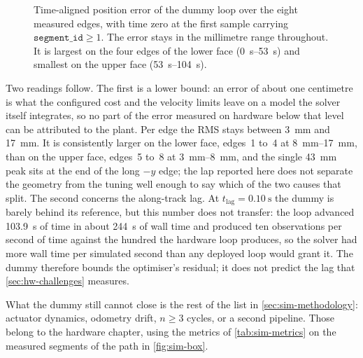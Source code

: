 \begin{figure}[htbp]
  \centering
  \caption[Residual of the dummy loop over the measured path]{%
    Time-aligned \ee{} position error of the dummy loop over the eight
    measured edges, with time zero at the first sample carrying
    $\texttt{segment\_id}\ge 1$. The error stays in the millimetre range
    throughout. It is largest on the four edges of the lower face
    (\qtyrange{0}{53}{\second}) and smallest on the upper face
    (\qtyrange{53}{104}{\second}).}
  \label{fig:sim-dummy-error}
\end{figure}

Two readings follow. The first is a lower bound: an \ee{} error of
about one centimetre is what the configured cost and the velocity limits
leave on a model the solver itself integrates, so no part of the error
measured on hardware below that level can be attributed to the plant.
Per edge the RMS stays between \qty{3}{\milli\meter} and
\qty{17}{\milli\meter}. It is consistently larger on the lower face,
edges~1 to~4 at \qtyrange{8}{17}{\milli\meter}, than on the upper face,
edges~5 to~8 at \qtyrange{3}{8}{\milli\meter}, and the single
\qty{43}{\milli\meter} peak sits at the end of the long $-y$ edge; the
lap reported here does not separate the geometry from the tuning well
enough to say which of the two causes that split. The
second concerns the along-track lag. At
$t_{\mathrm{lag}}=\qty{0.10}{\second}$ the dummy is barely behind its
reference, but this number does not transfer: the loop advanced
\qty{103.9}{\second} of \ocs{} time in about \qty{244}{\second} of wall
time and produced ten observations per second of \ocs{} time against
the hundred the hardware loop produces, so the solver had more wall time
per simulated second than any deployed loop would grant it. The dummy
therefore bounds the optimiser's residual; it does not predict the lag
that \cref{sec:hw-challenges} measures.

What the dummy still cannot close is the rest of the list in
\cref{sec:sim-methodology}: actuator dynamics, odometry drift,
$n\ge 3$ cycles, or a second pipeline. Those belong to the hardware
chapter, using the metrics of \cref{tab:sim-metrics} on the measured
segments of the path in \cref{fig:sim-box}.
